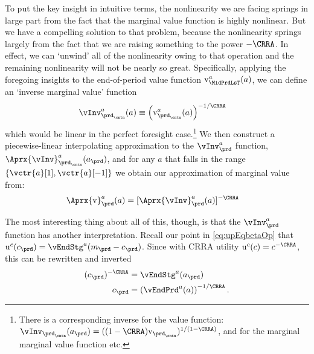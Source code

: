 \documentclass[titlepage, headings=optiontotocandhead]{econtex}
\begin{document}
To put the key insight in intuitive terms, the nonlinearity we are facing springs in large part from the fact that the marginal value function is highly nonlinear.  But we have a compelling solution to that problem, because the nonlinearity springs largely from the fact that we are raising something to the power $-\CRRA$.  In effect, we can `unwind' all of the nonlinearity owing to that operation and the remaining nonlinearity will not be nearly so great.  Specifically, applying the foregoing insights to the end-of-period value function $\mathrm{v}^{a}_{\MidPrdLsT}(a)$, we can define an `inverse marginal value' function
\begin{equation}\begin{gathered}\begin{aligned}
      \vInv_{\prd_\cntn}^{a}(a)  & \equiv  \left(\mathrm{v}^{a}_{\prd_\cntn}(a)\right)^{-1/\CRRA} \label{eq:cGoth}
    \end{aligned}\end{gathered}\end{equation}
which would be linear in the perfect foresight case.\footnote{There is a corresponding inverse for the value function: $\vInv_{\prd_\cntn}(a_{\prd})=((1-\CRRA)\mathrm{v}_{\prd_\cntn})^{1/(1-\CRRA)}$, and for the marginal marginal value function etc.}  We then construct a piecewise-linear interpolating approximation to the $\vInv_{\prd}^{a}$ function, $\Aprx{\vInv}_{\prd_\cntn}^{a}(a_{\prd})$, and for any $a$ that falls in the range $\{\vctr{a}[1],\vctr{a}[-1]\}$ we obtain our approximation of marginal value from:
\begin{equation}\begin{gathered}\begin{aligned}
      \Aprx{\mathrm{v}}_{\prd}^{a}(a) & =
      [\Aprx{\vInv}_{\prd}^{a}(a)]^{-\CRRA}
    \end{aligned}\end{gathered}\end{equation}

The most interesting thing about all of this, though, is that the $\vInv^{a}_{\prd}$ function has another interpretation. Recall our point in \eqref{eq:upEqbetaOp} that $\mathrm{u}^{c}(c_{\prd}) = \vEndStg^{a}(m_{\prd}-c_{\prd})$.  Since with CRRA utility $\mathrm{u}^{c}(c)=c^{-\CRRA}$, this can be rewritten
and inverted
\begin{equation}\begin{gathered}\begin{aligned}
      (c_{\prd})^{-\CRRA} & = \vEndStg^{a}(a_{\prd})
      \\ c_{\prd} & =      \left(\vEndPrd^{a}(a)\right)^{-1/\CRRA}.
    \end{aligned}\end{gathered}\end{equation}
\end{document}
